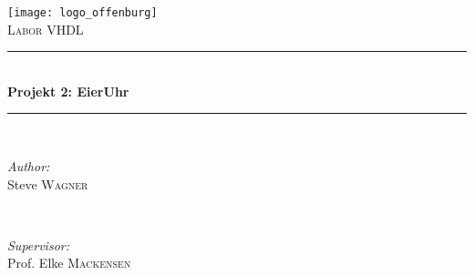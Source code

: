 \documentclass[a4paper, 11pt]{article}
\begin{document}
	
	\begin{titlepage}
		
		\newcommand{\HRule}{\rule{\linewidth}{0.5mm}} %
		
		\center %
		
		
		
		
		\texttt{[image: logo\_offenburg]}\\[2cm] %
		\textsc{\LARGE Labor VHDL}\\[0.5cm] %
		
		
		\HRule \\[1.1cm]
		{ \huge \bfseries Projekt 2: EierUhr}\\[0.4cm] %
		\HRule \\[1.5cm]
		
		
		\begin{minipage}{0.4\textwidth}
			\begin{flushleft} \large
				\emph{Author:}\\
				Steve \textsc{Wagner} %
			\end{flushleft}
		\end{minipage}
		~
		\begin{minipage}{0.4\textwidth}
			\begin{flushright} \large
				\emph{Supervisor:} \\
				Prof. Elke \textsc{Mackensen} %
			\end{flushright}
		\end{minipage}\\[2cm]
		

\end{titlepage}
\end{document}
